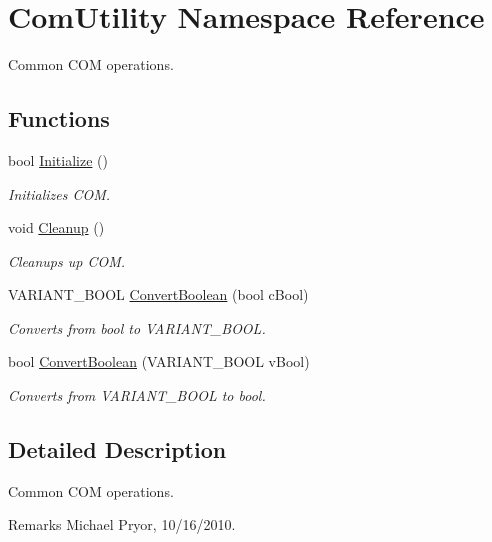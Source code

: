\hypertarget{namespace_com_utility}{
\section{ComUtility Namespace Reference}
\label{namespace_com_utility}
}


Common COM operations.  


\subsection*{Functions}
\begin{DoxyCompactItemize}
\item 
bool \hyperlink{namespace_com_utility_ac5510fce1ef3fa6f7c40a7fb94751d00}{Initialize} ()
\begin{DoxyCompactList}\small\item\em Initializes COM. \item\end{DoxyCompactList}\item 
\hypertarget{namespace_com_utility_adbbe42be9c6a35833b6e77e05f2c9f50}{
void \hyperlink{namespace_com_utility_adbbe42be9c6a35833b6e77e05f2c9f50}{Cleanup} ()}
\label{namespace_com_utility_adbbe42be9c6a35833b6e77e05f2c9f50}

\begin{DoxyCompactList}\small\item\em Cleanups up COM. \item\end{DoxyCompactList}\item 
VARIANT\_\-BOOL \hyperlink{namespace_com_utility_a03d035b7fc2030f7a69f2fa415ad4238}{ConvertBoolean} (bool cBool)
\begin{DoxyCompactList}\small\item\em Converts from bool to VARIANT\_\-BOOL. \item\end{DoxyCompactList}\item 
bool \hyperlink{namespace_com_utility_a260bc1227a67aae4afb584984f8ee7bb}{ConvertBoolean} (VARIANT\_\-BOOL vBool)
\begin{DoxyCompactList}\small\item\em Converts from VARIANT\_\-BOOL to bool. \item\end{DoxyCompactList}\end{DoxyCompactItemize}


\subsection{Detailed Description}
Common COM operations. \begin{DoxyRemark}{Remarks}
Michael Pryor, 10/16/2010. 
\end{DoxyRemark}


